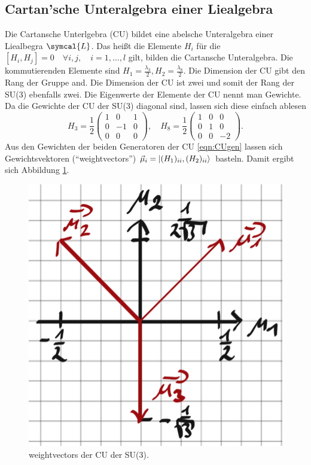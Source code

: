 \documentclass[
  captions=tableheading,  %
  titlepage=firstiscover, %
]{scrartcl}
\DeclarePairedDelimiter{\ket}{\lvert}{\rangle}
\begin{document}
\subsection{Cartan'sche Unteralgebra einer Liealgebra}
Die Cartansche Unterlgebra (CU) bildet eine abelsche Unteralgebra einer Liealbegra $\symcal{L}$.
Das heißt die Elemente $H_i$ für die $[H_i, H_j] = 0 \quad \forall i,j, \quad i = 1, \ldots, l$ gilt, bilden 
die Cartansche Unteralgebra.
Die kommutierenden Elemente sind $H_1 = \frac{\lambda_3}{2}, H_2 = \frac{\lambda_8}{2}$.
Die Dimension der CU gibt den Rang der Gruppe and.
Die Dimension der CU ist zwei und somit der Rang der SU(3) ebenfalls zwei.
Die Eigenwerte der Elemente der CU nennt man Gewichte.
Da die Gewichte der CU der SU(3) diagonal sind, lassen sich diese einfach ablesen
\begin{equation}
  H_3 = \frac{1}{2}
  \begin{pmatrix}
    1 &  0  & 1 \\
    0 & -1  & 0 \\ 
    0 & 0   & 0 
  \end{pmatrix} ,\quad 
  H_8 = \frac{1}{2}
  \begin{pmatrix}
    1 & 0 & 0 \\
    0 & 1 & 0 \\
    0 & 0 & -2
  \end{pmatrix}. \label{eqn:CUgen}
\end{equation}
Aus den Gewichten der beiden Generatoren der CU \eqref{eqn:CUgen} lassen sich 
Gewichtsvektoren (\enquote{weightvectors}) $\vec{\mu}_i = \ket{(H_1)_{ii}, (H_2)_{ii}}$ basteln.
Damit ergibt sich Abbildung \ref{fig:weightvectors}.
\begin{figure}
  \centering
  \includegraphics[width = 0.35 \textwidth]{CU_mu.jpg}
  \caption{weightvectors der CU der SU(3).}
  \label{fig:weightvectors}
\end{figure}
\end{document}
